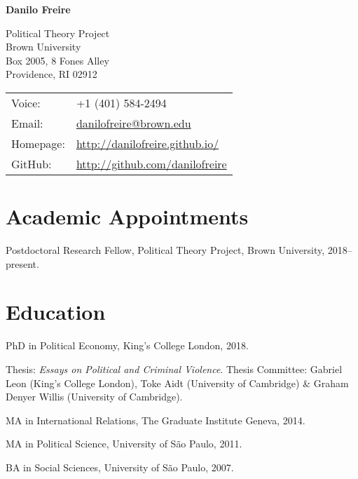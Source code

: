 \documentclass[a4paper]{article}
\def\name{Danilo Freire}
\renewenvironment{itemize}{
  \begin{list}{}{
    \setlength{\leftmargin}{1.5em}
  }
}{
  \end{list}
}
\begin{document}
{\huge \bf \name}


\vspace{0.25in}

\begin{minipage}{0.45\linewidth}
	Political Theory Project \\
	Brown University \\
	Box 2005, 8 Fones Alley \\
    Providence, RI 02912 
\end{minipage}
\begin{minipage}{0.45\linewidth}
	\begin{tabular}{ll}
	    Voice: & +1 (401) 584-2494 \\
		Email:          & \href{mailto:danilofreire@brown.edu}{danilofreire@brown.edu}          \\
		Homepage:       & \href{http://danilofreire.github.io/}{http://danilofreire.github.io/}             \\
		GitHub:         & \href{http://github.com/danilofreire}{http://github.com/danilofreire}
	\end{tabular}
\end{minipage}

\section*{Academic Appointments}

\begin{itemize}
	\item Postdoctoral Research Fellow, Political Theory Project, Brown University, 2018--present.
\end{itemize}

\section*{Education}

\begin{itemize}
	\item PhD in Political Economy, King's College London, 2018.
	\begin{itemize}
	    \item Thesis: \textit{Essays on Political and Criminal Violence}. Thesis Committee: Gabriel Leon (King's College London), Toke Aidt (University of Cambridge) \& Graham Denyer Willis (University of Cambridge).
	\end{itemize}
	\item MA in International Relations, The Graduate Institute Geneva, 2014.
	\item MA in Political Science, University of São Paulo, 2011.
	\item BA in Social Sciences, University of São Paulo, 2007.
\end{itemize}
\end{document}
